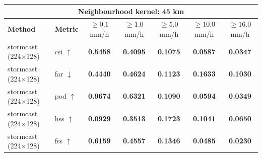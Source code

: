 \documentclass[border=10pt]{standalone}
\begin{document}
\begin{tabular}{llccccc}
\toprule
\multicolumn{7}{c}{\textbf{Neighbourhood kernel: 45 km}} \\
\midrule
\textbf{Method} & \textbf{Metric} & $\geq 0.1$ mm/h & $\geq 1.0$ mm/h & $\geq 5.0$ mm/h & $\geq 10.0$ mm/h & $\geq 16.0$ mm/h \\
\midrule
stormcast (224$\times$128) & csi $\uparrow$ & \textbf{0.5458} & \textbf{0.4095} & \textbf{0.1075} & \textbf{0.0587} & \textbf{0.0347} \\
\midrule
stormcast (224$\times$128) & far $\downarrow$ & \textbf{0.4440} & \textbf{0.4624} & \textbf{0.1123} & \textbf{0.1633} & \textbf{0.1030} \\
\midrule
stormcast (224$\times$128) & pod $\uparrow$ & \textbf{0.9674} & \textbf{0.6321} & \textbf{0.1090} & \textbf{0.0594} & \textbf{0.0349} \\
\midrule
stormcast (224$\times$128) & hss $\uparrow$ & \textbf{0.0929} & \textbf{0.3513} & \textbf{0.1723} & \textbf{0.1041} & \textbf{0.0650} \\
\midrule
stormcast (224$\times$128) & fss $\uparrow$ & \textbf{0.6159} & \textbf{0.4557} & \textbf{0.1346} & \textbf{0.0485} & \textbf{0.0230} \\
\bottomrule
\end{tabular}
\end{document}
